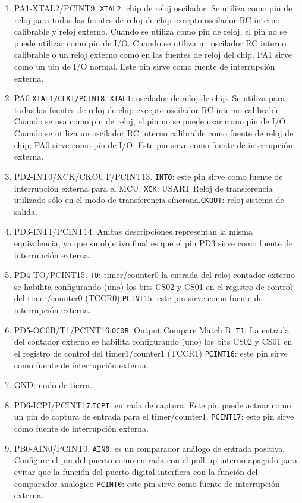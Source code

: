 \begin{enumerate}
\item PA1-XTAL2/PCINT9. \texttt{XTAL2}: chip de reloj oscilador. Se utiliza como pin de reloj para todas las fuentes de reloj de chip excepto oscilador RC interno calibrable y reloj externo. Cuando se utiliza como pin de reloj, el pin no se puede utilizar como pin de I/O. Cuando se utiliza un oscilador RC interno calibrable o un reloj externo como en las fuentes de reloj del chip, PA1 sirve como un pin de I/O normal. Este pin sirve como fuente de interrupción externa.
\item PA0-\texttt{XTAL1/CLKI/PCINT8}. \texttt{XTAL1}: oscilador de reloj de chip. Se utiliza para todas las fuentes de reloj de chip excepto oscilador RC interno calibrable. Cuando se usa como pin de reloj, el pin no se puede usar como pin de I/O. Cuando se utiliza un oscilador RC interno calibrable como fuente de reloj de chip, PA0 sirve como pin de I/O. Este pin sirve como fuente de interrupción externa.
\item PD2-INT0/XCK/CKOUT/PCINT13. \texttt{INTO}: este pin sirve como fuente de interrupción externa para el MCU. \texttt{XCK}: USART Reloj de transferencia utilizado sólo en el modo de transferencia síncrona.\texttt{CKOUT}: reloj sistema de salida.
\item PD3-INT1/PCINT14. Ambas descripciones representan la misma equivalencia, ya que su objetivo final es que el pin PD3 sirve como fuente de interrupción externa.
\item PD4-TO/PCINT15. \texttt{TO}: timer/counter0 la entrada del reloj contador externo se habilita configurando (uno) los bits CS02 y CS01 en el registro de control del timer/counter0 (TCCR0).\texttt{PCINT15}: este pin sirve como fuente de interrupción externa.
\item PD5-OC0B/T1/PCINT16.\texttt{OC0B}:  Output Compare Match B. \texttt{T1}: La entrada del contador externo se habilita configurando (uno) los bits CS02
y CS01 en el registro de control del timer1/counter1 (TCCR1) \texttt{PCINT16}: este pin sirve como fuente de interrupción externa.
\item GND: nodo de tierra.
\item PD6-ICPI/PCINT17.\texttt{ICPI}: entrada de captura. Este pin puede actuar como un pin de captura de entrada para el timer/counter1. \texttt{PCINT17}: este pin sirve como fuente de interrupción externa.
\item PB0-AIN0/PCINT0. \texttt{AIN0}: es un comparador análogo de entrada positiva. Configure el pin del puerto como entrada con el pull-up interno apagado para evitar que la función del puerto digital interfiera con la función del comparador analógico \texttt{PCINT0}: este pin sirve como fuente de interrupción externa.

\end{enumerate}
